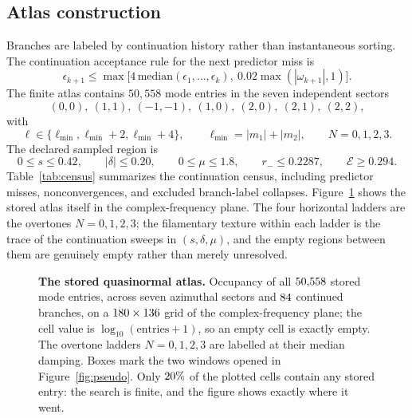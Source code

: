 \documentclass[10pt]{article}
\theoremstyle{plain}
\begin{document}
\subsection{Atlas construction}

Branches are labeled by continuation history rather than instantaneous sorting.
The continuation acceptance rule for the next predictor miss is
\begin{equation}
\epsilon_{k+1}\leq\max\bigl[4\,\mathrm{median}(\epsilon_1,\dots,\epsilon_k),\
0.02\max(|\omega_{k+1}|,1)\bigr].
\end{equation}
The finite atlas contains $50{,}558$ mode entries in the seven independent
sectors
\begin{equation}
(0,0),\ (1,1),\ (-1,-1),\ (1,0),\ (2,0),\ (2,1),\ (2,2),
\end{equation}
with
\begin{equation}
\ell\in\{\ell_{\min},\ell_{\min}+2,\ell_{\min}+4\},\qquad
\ell_{\min}=|m_1|+|m_2|,\qquad N=0,1,2,3 .
\end{equation}
The declared sampled region is
\begin{equation}
0\leq s\leq0.42,\qquad |\delta|\leq0.20,\qquad 0\leq\mu\leq1.8,\qquad
r_-\leq0.2287,\qquad \mathcal{E}\geq0.294 .
\label{eq:box}
\end{equation}
Table~\ref{tab:census} summarizes the continuation census, including predictor
misses, nonconvergences, and excluded branch-label collapses.
Figure~\ref{fig:atlas} shows the stored atlas itself in the complex-frequency
plane. The four horizontal ladders are the overtones $N=0,1,2,3$; the
filamentary texture within each ladder is the trace of the continuation sweeps
in $(s,\delta,\mu)$, and the empty regions between them are genuinely empty
rather than merely unresolved.

\begin{figure}[t]
\centering

\caption{\textbf{The stored quasinormal atlas.} Occupancy of all
$50{,}558$ stored mode entries, across seven azimuthal sectors and
$84$ continued branches, on a $180\times136$ grid
of the complex-frequency plane; the cell value is
$\log_{10}(\text{entries}+1)$, so an empty cell is exactly empty. The overtone
ladders $N=0,1,2,3$ are labelled at their median damping. Boxes mark the two
windows opened in Figure~\ref{fig:pseudo}. Only $20\%$ of the
plotted cells contain any stored entry: the search is finite, and the figure
shows exactly where it went.}
\label{fig:atlas}
\end{figure}
\end{document}
